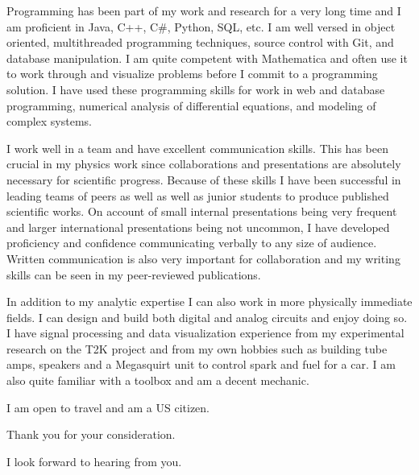 \documentclass[12pt,a4paper,ariel]{moderncv}        %
\begin{document}
Programming has been part of my work and research for a very long time and I am proficient in Java, C++, C\#, Python, SQL, etc.  I am well versed in object oriented, multithreaded programming techniques, source control with Git, and database manipulation.  I am quite competent with Mathematica and often use it to work through and visualize problems before I commit to a programming solution.  I have used these programming skills for work in web and database programming,  numerical analysis of differential equations, and modeling of complex systems.  

I work well in a team and have excellent communication skills.  This has been crucial in my physics work since collaborations and presentations are absolutely necessary for scientific progress.  Because of these skills I have been successful in leading teams of peers as well as well as junior students to produce published scientific works.  On account of small internal presentations being very frequent and larger international presentations being not uncommon, I have developed proficiency and confidence communicating verbally to any size of audience.  Written communication is also very important for collaboration and my writing skills can be seen in my peer-reviewed publications.

In addition to my analytic expertise I can also work in more physically immediate fields.  I can design and build both digital and analog circuits and enjoy doing so.  I have signal processing and data visualization experience from my experimental research on the T2K project and from my own hobbies such as building tube amps, speakers and a Megasquirt unit to control spark and fuel for a car.  I am also quite familiar with a toolbox and am a decent mechanic.

I am open to travel and am a US citizen.

Thank you for your consideration.

I look forward to hearing from you.

\makeletterclosing
\end{document}

